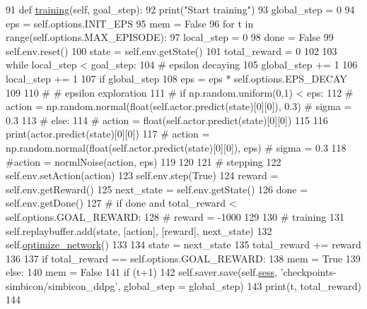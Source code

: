 \begin{DoxyCode}
91     \textcolor{keyword}{def }\hyperlink{classddpg_1_1_d_d_p_g_a5237a908e38e5ac76c6b733fc61aeb3d}{training}(self, goal\_step):
92         print(\textcolor{stringliteral}{"Start training"})
93         global\_step = 0
94         eps = self.options.INIT\_EPS
95         mem = \textcolor{keyword}{False}
96         \textcolor{keywordflow}{for} t \textcolor{keywordflow}{in} range(self.options.MAX\_EPISODE):
97             local\_step = 0
98             done = \textcolor{keyword}{False}
99             self.env.reset()
100             state = self.env.getState()
101             total\_reward = 0
102 
103             \textcolor{keywordflow}{while} local\_step < goal\_step:
104                 \textcolor{comment}{# epsilon decaying}
105                 global\_step += 1
106                 local\_step += 1
107                 \textcolor{keywordflow}{if} global\_step %
108                     eps = eps * self.options.EPS\_DECAY
109 
110                 \textcolor{comment}{# # epsilon exploration}
111                 \textcolor{comment}{# if np.random.uniform(0,1) < eps:}
112                 \textcolor{comment}{#   action = np.random.normal(float(self.actor.predict(state)[0][0]), 0.3) # sigma = 0.3}
113                 \textcolor{comment}{# else:}
114                 \textcolor{comment}{#   action = float(self.actor.predict(state)[0][0])}
115                 
116                 print(actor.predict(state)[0][0])
117                 \textcolor{comment}{# action = np.random.normal(float(self.actor.predict(state)[0][0]), eps) # sigma = 0.3}
118                 \textcolor{comment}{#action = normlNoise(action, eps)}
119 
120 
121                 \textcolor{comment}{# stepping}
122                 self.env.setAction(action)
123                 self.env.step(\textcolor{keyword}{True})
124                 reward = self.env.getReward()
125                 next\_state = self.env.getState()
126                 done = self.env.getDone()
127                 \textcolor{comment}{# if done and total\_reward < self.options.GOAL\_REWARD:}
128                 \textcolor{comment}{#   reward = -1000}
129 
130                 \textcolor{comment}{# training}
131                 self.replaybuffer.add(state, [action], [reward], next\_state)
132                 self.\hyperlink{classddpg_1_1_d_d_p_g_a06c8a226bfc7c56f33a74da00ed8bcec}{optimize\_network}()
133 
134                 state = next\_state
135                 total\_reward += reward
136 
137             \textcolor{keywordflow}{if} total\_reward == self.options.GOAL\_REWARD:
138                 mem = \textcolor{keyword}{True}
139             \textcolor{keywordflow}{else}:
140                 mem = \textcolor{keyword}{False}
141             \textcolor{keywordflow}{if} (t+1)%
142                 self.saver.save(self.\hyperlink{classddpg_1_1_d_d_p_g_a9fed3bda5c1636b1c4bb89fe3a4293c5}{sess}, \textcolor{stringliteral}{'checkpoints-simbicon/simbicon\_ddpg'}, global\_step = 
      global\_step)
143             print(t, total\_reward)
144 
\end{DoxyCode}


